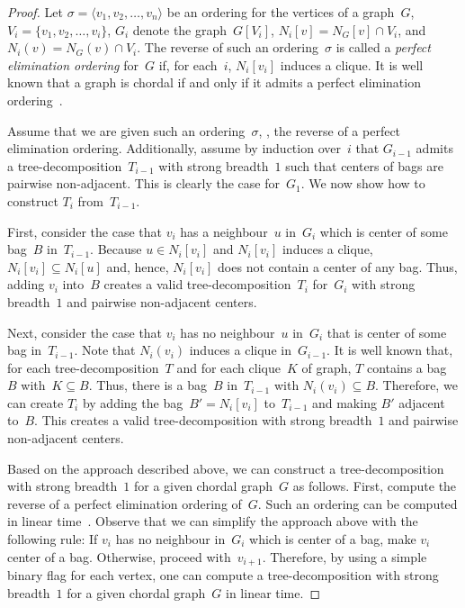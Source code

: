 \begin{proof}
Let $\sigma = \langle v_1, v_2, \ldots, v_n \rangle$ be an ordering for the vertices of a graph~$G$, $V_i = \{ v_1, v_2, \ldots, v_i \}$, $G_i$ denote the graph~$G[V_i]$, $N_i[v] = N_G[v] \cap V_i$, and $N_i(v) = N_G(v) \cap V_i$.
The reverse of such an ordering~$\sigma$ is called a \emph{perfect elimination ordering} for~$G$ if, for each~$i$, $N_i[v_i]$ induces a clique.
It is well known that a graph is chordal if and only if it admits a perfect elimination ordering~\cite{Dirac1961}.

Assume that we are given such an ordering~$\sigma$, \ie, the reverse of a perfect elimination ordering.
Additionally, assume by induction over~$i$ that $G_{i-1}$ admits a tree-decomposition~$T_{i-1}$ with strong breadth~$1$ such that centers of bags are pairwise non-adjacent.
This is clearly the case for~$G_1$.
We now show how to construct $T_i$ from~$T_{i-1}$.

First, consider the case that $v_i$ has a neighbour~$u$ in~$G_i$ which is center of some bag~$B$ in~$T_{i-1}$.
Because $u \in N_i[v_i]$ and $N_i[v_i]$ induces a clique, $N_i[v_i] \subseteq N_i[u]$ and, hence, $N_i[v_i]$ does not contain a center of any bag.
Thus, adding $v_i$ into~$B$ creates a valid tree-decomposition~$T_i$ for~$G_i$ with strong breadth~$1$ and pairwise non-adjacent centers.

Next, consider the case that $v_i$ has no neighbour~$u$ in~$G_i$ that is center of some bag in~$T_{i-1}$.
Note that $N_i(v_i)$ induces a clique in~$G_{i-1}$.
It is well known that, for each tree-decomposition~$T$ and for each clique~$K$ of graph, $T$ contains a bag~$B$ with~$K \subseteq B$.
Thus, there is a bag~$B$ in~$T_{i-1}$ with $N_i(v_i) \subseteq B$.
Therefore, we can create $T_i$ by adding the bag~$B' = N_i[v_i]$ to~$T_{i-1}$ and making $B'$ adjacent to~$B$.
This creates a valid tree-decomposition with strong breadth~$1$ and pairwise non-adjacent centers.

Based on the approach described above, we can construct a tree-decomposition with strong breadth~$1$ for a given chordal graph~$G$ as follows.
First, compute the reverse of a perfect elimination ordering of~$G$.
Such an ordering can be computed in linear time~\cite{RoseTarjLuek1976}.
Observe that we can simplify the approach above with the following rule:
If $v_i$ has no neighbour in~$G_i$ which is center of a bag, make $v_i$ center of a bag.
Otherwise, proceed with~$v_{i+1}$.
Therefore, by using a simple binary flag for each vertex, one can compute a tree-decomposition with strong breadth~$1$ for a given chordal graph~$G$ in linear time.
\end{proof}

